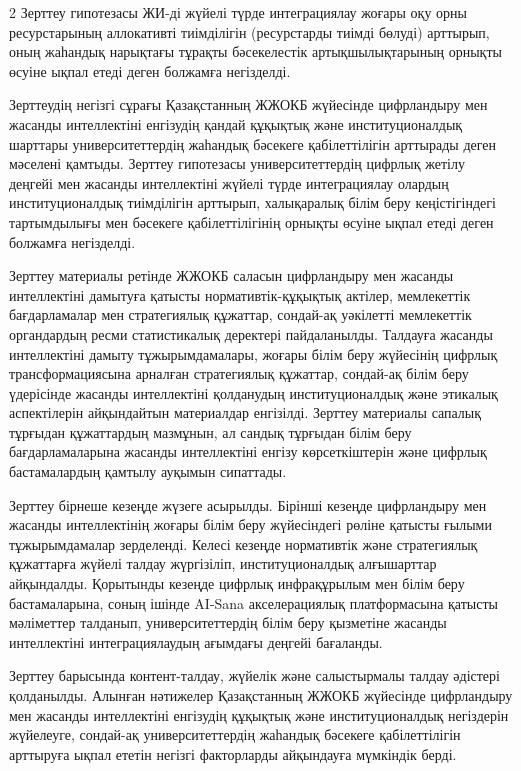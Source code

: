 \begin{multicols}{2}
Зерттеу гипотезасы ЖИ-ді жүйелі түрде интеграциялау жоғары оқу орны
ресурстарының аллокативті тиімділігін (ресурстарды тиімді бөлуді)
арттырып, оның жаһандық нарықтағы тұрақты бәсекелестік артықшылықтарының
орнықты өсуіне ықпал етеді деген болжамға негізделді.

Зерттеудің негізгі сұрағы Қазақстанның ЖЖОКБ жүйесінде цифрландыру мен
жасанды интеллектіні енгізудің қандай құқықтық және институционалдық
шарттары университеттердің жаһандық бәсекеге қабілеттілігін арттырады
деген мәселені қамтыды. Зерттеу гипотезасы университеттердің цифрлық
жетілу деңгейі мен жасанды интеллектіні жүйелі түрде интеграциялау
олардың институционалдық тиімділігін арттырып, халықаралық білім беру
кеңістігіндегі тартымдылығы мен бәсекеге қабілеттілігінің орнықты өсуіне
ықпал етеді деген болжамға негізделді.

Зерттеу материалы ретінде ЖЖОКБ саласын цифрландыру мен жасанды
интеллектіні дамытуға қатысты нормативтік-құқықтық актілер, мемлекеттік
бағдарламалар мен стратегиялық құжаттар, сондай-ақ уәкілетті мемлекеттік
органдардың ресми статистикалық деректері пайдаланылды. Талдауға жасанды
интеллектіні дамыту тұжырымдамалары, жоғары білім беру жүйесінің цифрлық
трансформациясына арналған стратегиялық құжаттар, сондай-ақ білім беру
үдерісінде жасанды интеллектіні қолданудың институционалдық және
этикалық аспектілерін айқындайтын материалдар енгізілді. Зерттеу
материалы сапалық тұрғыдан құжаттардың мазмұнын, ал сандық тұрғыдан
білім беру бағдарламаларына жасанды интеллектіні енгізу көрсеткіштерін
және цифрлық бастамалардың қамтылу ауқымын сипаттады.

Зерттеу бірнеше кезеңде жүзеге асырылды. Бірінші кезеңде цифрландыру мен
жасанды интеллектінің жоғары білім беру жүйесіндегі рөліне қатысты
ғылыми тұжырымдамалар зерделенді. Келесі кезеңде нормативтік және
стратегиялық құжаттарға жүйелі талдау жүргізіліп, институционалдық
алғышарттар айқындалды. Қорытынды кезеңде цифрлық инфрақұрылым мен білім
беру бастамаларына, соның ішінде AI-Sana акселерациялық платформасына
қатысты мәліметтер талданып, университеттердің білім беру қызметіне
жасанды интеллектіні интеграциялаудың ағымдағы деңгейі бағаланды.

Зерттеу барысында контент-талдау, жүйелік және салыстырмалы талдау
әдістері қолданылды. Алынған нәтижелер Қазақстанның ЖЖОКБ жүйесінде
цифрландыру мен жасанды интеллектіні енгізудің құқықтық және
институционалдық негіздерін жүйелеуге, сондай-ақ университеттердің
жаһандық бәсекеге қабілеттілігін арттыруға ықпал ететін негізгі
факторларды айқындауға мүмкіндік берді.


\end{multicols}

